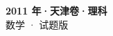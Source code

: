 \documentclass[zihao=-4, a4paper]{ctexart}
\begin{document}
\begin{center}
  {\Large\bfseries 2011 年·天津卷·理科}\\[4pt]
  {\large 数学 · 试题版}
\end{center}
\medskip
{}

\end{document}
